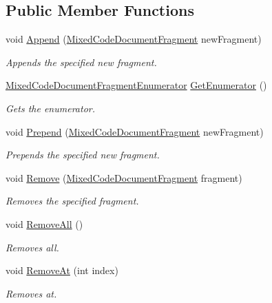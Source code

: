 \subsection*{Public Member Functions}
\begin{DoxyCompactItemize}
\item 
void \hyperlink{class_html_agility_pack_1_1_mixed_code_document_fragment_list_a177819adf1834ce273c01f1b88353c05}{Append} (\hyperlink{class_html_agility_pack_1_1_mixed_code_document_fragment}{Mixed\+Code\+Document\+Fragment} new\+Fragment)
\begin{DoxyCompactList}\small\item\em Appends the specified new fragment. \end{DoxyCompactList}\item 
\hyperlink{class_html_agility_pack_1_1_mixed_code_document_fragment_list_1_1_mixed_code_document_fragment_enumerator}{Mixed\+Code\+Document\+Fragment\+Enumerator} \hyperlink{class_html_agility_pack_1_1_mixed_code_document_fragment_list_aec2057c0d77e871913bed844f5fdf0fc}{Get\+Enumerator} ()
\begin{DoxyCompactList}\small\item\em Gets the enumerator. \end{DoxyCompactList}\item 
void \hyperlink{class_html_agility_pack_1_1_mixed_code_document_fragment_list_a4d0e1fa45e09f8b4668c63f35461ea94}{Prepend} (\hyperlink{class_html_agility_pack_1_1_mixed_code_document_fragment}{Mixed\+Code\+Document\+Fragment} new\+Fragment)
\begin{DoxyCompactList}\small\item\em Prepends the specified new fragment. \end{DoxyCompactList}\item 
void \hyperlink{class_html_agility_pack_1_1_mixed_code_document_fragment_list_ac8f829643676c74bfa02ee98561d77fb}{Remove} (\hyperlink{class_html_agility_pack_1_1_mixed_code_document_fragment}{Mixed\+Code\+Document\+Fragment} fragment)
\begin{DoxyCompactList}\small\item\em Removes the specified fragment. \end{DoxyCompactList}\item 
void \hyperlink{class_html_agility_pack_1_1_mixed_code_document_fragment_list_a00212e61c0effd67236952858f27fb9b}{Remove\+All} ()
\begin{DoxyCompactList}\small\item\em Removes all. \end{DoxyCompactList}\item 
void \hyperlink{class_html_agility_pack_1_1_mixed_code_document_fragment_list_ad987c8567b42ec7b5a3247f3871bbda7}{Remove\+At} (int index)
\begin{DoxyCompactList}\small\item\em Removes at. \end{DoxyCompactList}\end{DoxyCompactItemize}
